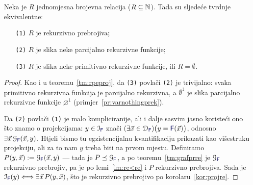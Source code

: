 \begin{teorem}
Neka je $R$ jednomjesna brojevna relacija ($R\subseteq{\mathbb N}$). Tada su sljedeće tvrdnje ekvivalentne:
\begin{enumerate}
    \item[\texttt{\textup{(1)}}] $R$ je rekurzivno prebrojiva;
    \item[\texttt{\textup{(2)}}] $R$ je slika neke parcijalno rekurzivne funkcije;
    \item[\texttt{\textup{(3)}}] $R$ je slika neke primitivno rekurzivne funkcije, ili $R=\emptyset$.
\end{enumerate}
\end{teorem}
\begin{proof}
Kao i u teoremu~\ref{tm:rpeproj}, da \texttt{(3)} povlači \texttt{(2)} je trivijalno: svaka primitivno rekurzivna funkcija je parcijalno rekurzivna, a $\emptyset^1$ je slika parcijalno rekurzivne funkcije $\varnothing^1$ (primjer~\ref{pr:varnothingprek}).

Da \texttt{(2)} povlači \texttt{(1)} je malo kompliciranije, ali i dalje sasvim jasno koristeći ono što znamo o projekcijama: $y\in\im{\f F}$ znači $(\exists\vec x\in\dom{\f F})\bigl(y=\f F(\vec x)\bigr)$, odnosno $\exists\vec x\,\graf{\f F}(\vec x,y)$. Htjeli bismo tu egzistencijalnu kvantifikaciju prikazati kao višestruku projekciju, ali za to nam $y$ treba biti na prvom mjestu. Definiramo $P(y,\vec x):=\graf{\f F}(\vec x,y)$ --- tada je $P\preceq\graf{\f F}$, a po teoremu~\ref{tm:grafprre} je $\graf{\f F}$ rekurzivno prebrojiv, pa je po lemi~\ref{lm:re<re} i $P$ rekurzivno prebrojiva. Sada je $\im{\f F}(y)\Longleftrightarrow\exists\vec x\,P(y,\vec x)$, što je rekurzivno prebrojivo po korolaru~\ref{kor:projre}.


\end{proof}
